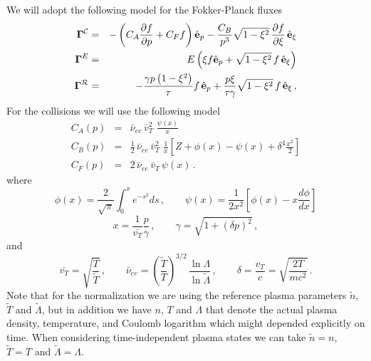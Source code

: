 \documentclass[preprint,11pt]{elsarticle}
\newcommand{\bq}{\begin{equation}}
\newcommand{\eq}{\end{equation}}
\begin{document}
We will adopt the following model for the Fokker-Planck fluxes
\begin{eqnarray}
{\bf \Gamma}^{\cal C}&=& -\left ( C_A \frac{\partial f}{\partial p} + C_F f \right) \hat {\bf e}_p-
\frac{C_B}{p^3} \sqrt{1-\xi^2} \, \frac{\partial f}{\partial \xi}\, \hat {\bf e}_\xi \\
{\bf \Gamma}^{E}&=& E \left(\xi f  \hat {\bf e}_p + \sqrt{1-\xi^2}  \, f\, \hat {\bf e}_\xi \right) \\
{\bf \Gamma}^{\cal R}&=& -\frac{\gamma p \left(1-\xi^2\right)}{\tau} f \, \hat {\bf e}_p +
\frac{p \xi}{\tau \gamma} \sqrt{1-\xi^2}\, f\, \hat {\bf e}_\xi \, ,
\end{eqnarray}
For the collisions we will use the following model
\begin{eqnarray}
C_A (p) &=& \bar{\nu}_{ee} \, \bar{v}_T^2 \,\,\frac{\psi(x)}{x}
 \\
C_B (p)&=& \frac{1}{2} \,\bar{\nu}_{ee} 
\, \bar{v}_T^2 \, \, \frac{1}{x}  \left[ Z + \phi(x)- \psi(x) + \delta^4  \frac{x^2}{2} \right]\\
C_F (p)&=&2\,\bar{\nu}_{ee}  \, \bar{v}_T \, \psi(x) \, .
\end{eqnarray}
where
\bq
\phi(x)=\frac{2}{\sqrt{\pi}} \int_0^x e^{-s^2} ds \, ,\qquad
\psi(x)=\frac{1}{2 x^2} \left[ \phi(x)-x \frac{d \phi}{dx} \right] 
\eq
\bq
x=\frac{1}{\bar{v_T}} \frac{p}{\gamma}\, , \qquad
\gamma=\sqrt{1+\left(\delta p\right)^2} \, ,
\eq
and
\bq
\bar{v_T}=\sqrt{\frac{T}{\tilde{T}}}\, , \qquad \bar{\nu}_{ee}=\left(\frac{\tilde{T}}{T}\right)^{3/2}\, \frac{\ln \Lambda}{\ln \tilde{\Lambda}} \, , \qquad  \delta=\frac{v_T}{c}=\sqrt{\frac{2 T}{m c^2}} \, .
\eq
Note that for the normalization we are using the reference plasma parameters $\tilde{n}$, $\tilde{T}$ and 
$\tilde{\Lambda}$, but in addition we have $n$, $T$ and $\Lambda$ that denote the actual plasma density, temperature,  and Coulomb logarithm which might depended explicitly on time. When considering time-independent plasma states we can take $\tilde{n}=n$, $\tilde{T}=T$ and 
$\tilde{\Lambda}=\Lambda$. 

\end{document}
